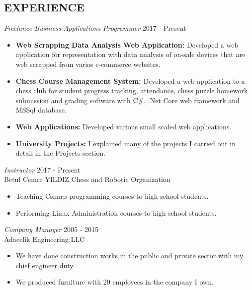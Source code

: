 \documentclass[line,margin]{res}
\begin{document}
\begin{resume}
\begin{itemize}
\section{EXPERIENCE} {\sl Freelance Business Applications Programmer} \hfill  2017 - Present \\
                 \begin{itemize}  \itemsep -2pt %
                 \item \textbf{Web Scrapping Data Analysis Web Application: } Developed a web application for representation with data analysis of on-sale devices that are web scrapped from varios e-commerce websites. 
                 \item \textbf{Chess Course Management System: } Developed a web application to a chess club for student progress tracking, attendance, chess puzzle homework submission and grading software with C\#, .Net Core web framework and MSSql database. 
                \item \textbf{Web Applications: } Developed various small scaled web applications.
                \item \textbf{University Projects: } I explained many of the projects I carried out in detail in the Projects section.
                \end{itemize}
 
                {\sl  Instructor} \hfill             2017 - Present \\
                Betul Cemre YILDIZ Chess and Robotic Organization
                 \begin{itemize}  \itemsep -2pt %
                 \item Teaching Csharp programming courses to high school students.
                 \item Performing  Linux Administration courses to high school students.
                 \end{itemize} 

                 
                {\sl Company Manager} \hfill        2005 - 2015 \\
                Adacelik Engineering LLC
                  \begin{itemize}
                   \item We have done construction works in the public and private sector with my chief engineer duty.
                     
                   \item We produced furniture with 20 employees in the company I own.
                   \end{itemize} 


\end{itemize}
\end{resume}
\end{document}

